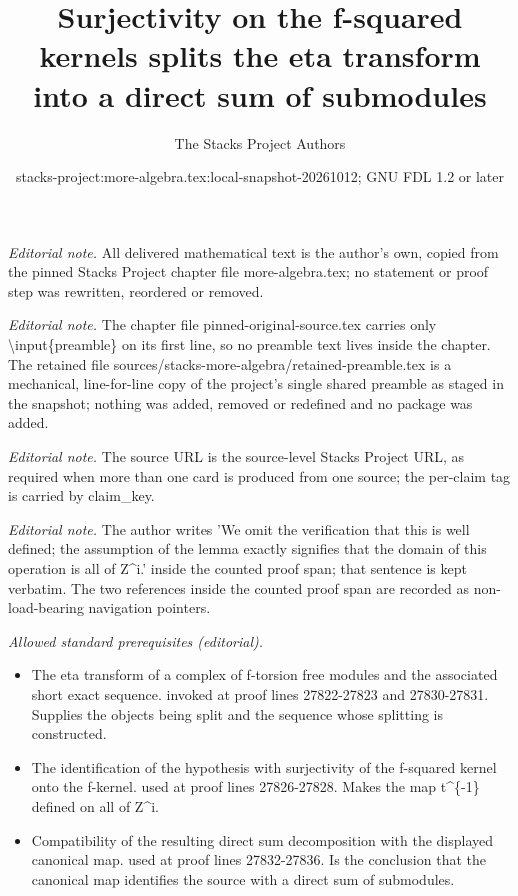 \documentclass[10pt,a4paper]{amsart}
\title{Surjectivity on the f-squared kernels splits the eta transform into a direct sum of submodules}
\author{The Stacks Project Authors}
\date{stacks-project:more-algebra.tex:local-snapshot-20261012; GNU FDL 1.2 or later}
\theoremstyle{plain}
\theoremstyle{definition}
\theoremstyle{remark}
\numberwithin{equation}{subsection}
\begin{document}
\maketitle
\setcounter{subsection}{1}
\noindent\textit{Editorial note.} All delivered mathematical text is the author's own, copied from the pinned Stacks Project chapter file more-algebra.tex; no statement or proof step was rewritten, reordered or removed.\par\medskip
\noindent\textit{Editorial note.} The chapter file pinned-original-source.tex carries only \textbackslash{}input\{preamble\} on its first line, so no preamble text lives inside the chapter. The retained file sources/stacks-more-algebra/retained-preamble.tex is a mechanical, line-for-line copy of the project's single shared preamble as staged in the snapshot; nothing was added, removed or redefined and no package was added.\par\medskip
\noindent\textit{Editorial note.} The source URL is the source-level Stacks Project URL, as required when more than one card is produced from one source; the per-claim tag is carried by claim\_key.\par\medskip
\noindent\textit{Editorial note.} The author writes 'We omit the verification that this is well defined; the assumption of the lemma exactly signifies that the domain of this operation is all of Z\textasciicircum{}i.' inside the counted proof span; that sentence is kept verbatim. The two references inside the counted proof span are recorded as non-load-bearing navigation pointers.\par\medskip
\noindent\textit{Allowed standard prerequisites (editorial).}\begin{itemize}
\item The eta transform of a complex of f-torsion free modules and the associated short exact sequence. invoked at proof lines 27822-27823 and 27830-27831. Supplies the objects being split and the sequence whose splitting is constructed.
\item The identification of the hypothesis with surjectivity of the f-squared kernel onto the f-kernel. used at proof lines 27826-27828. Makes the map t\textasciicircum{}\{-1\} defined on all of Z\textasciicircum{}i.
\item Compatibility of the resulting direct sum decomposition with the displayed canonical map. used at proof lines 27832-27836. Is the conclusion that the canonical map identifies the source with a direct sum of submodules.
\end{itemize}\medskip
\end{document}
